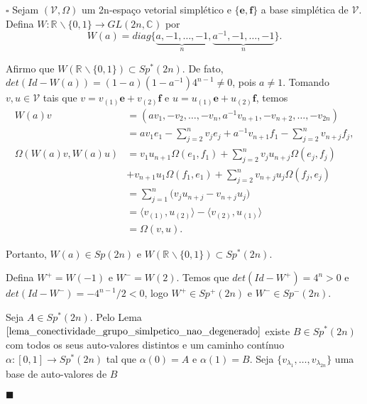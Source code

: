 \documentclass[12pt]{book}
\newenvironment{prova}[1]{$\square$ #1}{\hfill$\blacksquare$}
\newcommand{\bigparenteses}[1]{\Big( #1 \Big) }
\newcommand{\complementar}[2]{#1 \backslash #2}
\newcommand{\complexificado}[1]{\mathcal{#1}}
\newcommand{\complexo}[1]{\mathbb{C}^{#1}}
\newcommand{\formaSimpleticaExtendida}[2]{\Omega(#1, #2)}
\newcommand{\generalgroup}[2]{GL(#1, #2)}
\newcommand{\generalgroupcomplexo}[1]{\generalgroup{#1}{\complexo{}}}
\newcommand{\gruposimpletico}[1]{Sp(#1)}
\newcommand{\gruposimpleticonaodegenerado}[1]{Sp^{#1}(2n)}
\newcommand{\produtointerno}[2]{\langle #1, #2 \rangle}
\newcommand{\real}[1]{\mathbb{R}^{#1}}
\newcommand{\reta}{\real{}}
\begin{document}
	\begin{prova}
		Sejam $(\complexificado{V}, \Omega)$ um 2n-espaço vetorial simplético e $\{\textbf{e}, \textbf{f}\}$ a base simplética de $\complexificado{V}$. Defina $W: \complementar{\reta}{\{0,1\}} \to \generalgroupcomplexo{2n}$ por
		$$
		W(a) = diag\{\underbrace{a, -1, \dots, -1}_{n}, \underbrace{a^{-1}, -1, \dots , -1}_{n}\}.
		$$
		
		Afirmo que $W(\complementar{\reta}{\{0,1\}}) \subset \gruposimpleticonaodegenerado{*}$. De fato, $det(Id - W(a)) = (1-a)(1-a^{-1})4^{n-1} \neq 0$, pois $a\neq 1$. Tomando $v,u \in \complexificado{V}$ tais que $v=v_{(1)}\textbf{e}+ v_{(2)}\textbf{f}$ e $u=u_{(1)}\textbf{e}+ u_{(2)}\textbf{f}$, temos 
		$$
		\begin{aligned}	
		W(a)v &= (av_{1}, -v_{2}, \dots, -v_{n}, a^{-1}v_{n+1}, -v_{n+2}, \dots, -v_{2n})
		\\
		&= av_{1}e_{1}  -\sum_{j=2}^{n} v_{j}e_{j} + a^{-1}v_{n+1}f_{1} -\sum_{j=2}^{n} v_{n+j}f_{j},
		\\
		\formaSimpleticaExtendida{W(a)v}{W(a)u} 
		&=v_{1}u_{n+1}\formaSimpleticaExtendida{e_{1}}{f_{1}} + \sum_{j=2}^{n}v_{j}u_{n+j}\formaSimpleticaExtendida{e_{j}}{f_{j}}
		\\
		&+v_{n+1}u_{1}\formaSimpleticaExtendida{f_{1}}{e_{1}} + \sum_{j=2}^{n} v_{n+j}u_{j}\formaSimpleticaExtendida{f_{j}}{e_{j}}
		\\
		&=\sum_{j=1}^{n}\bigparenteses{v_{j}u_{n+j} - 	v_{n+j}u_{j}}
		\\
		&= \produtointerno{v_{(1)}}{u_{(2)}} - \produtointerno{v_{(2)}}{u_{(1)}}
		\\
		&= \formaSimpleticaExtendida{v}{u}.
		\end{aligned}
		$$ 
		
		Portanto, $W(a) \in \gruposimpletico{2n}$ e $W(\complementar{\reta}{\{0,1\}}) \subset \gruposimpleticonaodegenerado{*}$.
		
		Defina $W^{+} = W(-1)$ e $W^{-} = W(2)$. Temos que $det(Id - W^{+}) = 4^{n}>0$  e $det(Id - W^{-}) = -4^{n-1}/2 <0$, logo $W^{+}\in \gruposimpleticonaodegenerado{+}$ e $W^{-}\in \gruposimpleticonaodegenerado{-}$. 
		
		Seja $A \in \gruposimpleticonaodegenerado{*}$. Pelo Lema $\ref{lema_conectividade_grupo_simlpetico_nao_degenerado}$ existe $B \in \gruposimpleticonaodegenerado{*}$ com todos os seus auto-valores distintos  e um caminho contínuo $\alpha:[0,1] \to \gruposimpleticonaodegenerado{*}$ tal que $\alpha(0)=A$ e $\alpha(1) = B$. Seja $\{v_{\lambda_{1}}, \dots , v_{\lambda_{2n}} \}$ uma base de auto-valores de $B$ 
		

\end{prova}
\end{document}
